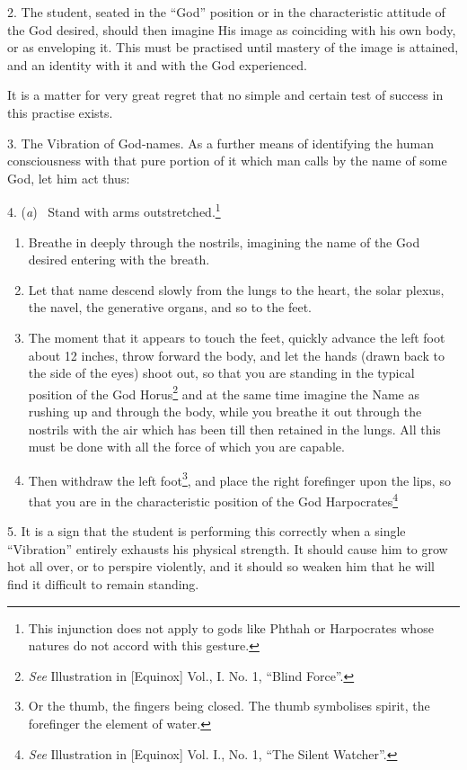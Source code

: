 2. The student, seated in the \enquote{God} position or in the characteristic attitude of the God desired, should then imagine His image as coinciding with his own body, or as enveloping it. This must be practised until mastery of the image is attained, and an identity with it and with the God experienced.

It is a matter for very great regret that no simple and certain test of success in this practise exists.

3. The Vibration of God-names. As a further means of identifying the human consciousness with that pure portion of it which man calls by the name of some God, let him act thus:

4. (\textit{a}) \-\ Stand with arms outstretched.\footnote{This injunction does not apply to gods like Phthah or Harpocrates whose natures do not accord with this gesture.} \begin{enumerate}[start=2, label=(\textit{\alph*}), leftmargin=3.57\parindent]
\item Breathe in deeply through the nostrils, imagining the name of the God desired entering with the breath.
\item Let that name descend slowly from the lungs to the heart, the solar plexus, the navel, the generative organs, and so to the feet.
\item The moment that it appears to touch the feet, quickly advance the left foot about 12 inches, throw forward the body, and let the hands (drawn back to the side of the eyes) shoot out, so that you are standing in the typical position of the God Horus\footnote{\textit{See} Illustration in [Equinox] Vol., I. No. 1, \enquote{Blind Force}.} and at the same time imagine the Name as rushing up and through the body, while you breathe it out through the nostrils with the air which has been till then retained in the lungs. All this must be done with all the force of which you are capable.
\item Then withdraw the left foot\footnote{Or the thumb, the fingers being closed. The thumb symbolises spirit, the forefinger the element of water.}, and place the right forefinger upon the lips, so that you are in the characteristic position of the God Harpocrates\footnote{\textit{See} Illustration in [Equinox] Vol. I., No. 1, \enquote{The Silent Watcher}.}
\end{enumerate}

5. It is a sign that the student is performing this correctly when a single \enquote{Vibration} entirely exhausts his physical strength. It should cause him to grow hot all over, or to perspire violently, and it should so weaken him that he will find it difficult to remain standing.

